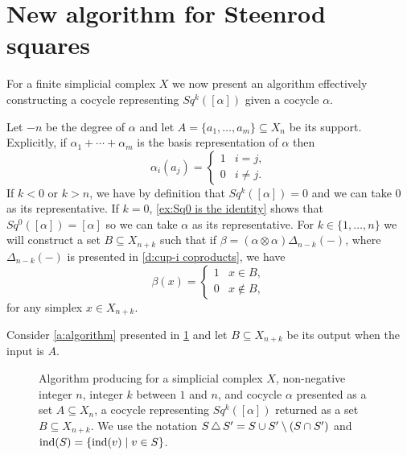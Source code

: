 
\section{New algorithm for Steenrod squares} \label{s:algorithm}


For a finite simplicial complex $X$ we now present an algorithm effectively constructing a cocycle representing $Sq^k([\alpha])$ given a cocycle $\alpha$.

Let $-n$ be the degree of $\alpha$ and let $A = \{a_1, \dots, a_m\} \subseteq X_n$ be its support.
Explicitly, if $\alpha_1 + \cdots + \alpha_m$ is the basis representation of $\alpha$ then
\begin{equation*}
\alpha_i(a_j) = \begin{cases}
1 & i=j, \\ 0 & i\neq j.
\end{cases}
\end{equation*}
If $k < 0$ or $k > n$, we have by definition that $Sq^k([\alpha]) = 0$ and we can take $0$ as its representative.
If $k = 0$, \cref{ex:Sq0 is the identity} shows that $Sq^0([\alpha]) = [\alpha]$ so we can take $\alpha$ as its representative.
For $k \in \{1, \dots, n\}$ we will construct a set $B \subseteq X_{n+k}$ such that if $\beta = (\alpha \otimes \alpha)\Delta_{n-k}(-)$, where $\Delta_{n-k}(-)$ is presented in \cref{d:cup-i coproducts}, we have
\begin{equation} \label{e:correctness}
\beta(x) =
\begin{cases}
1 & x \in B, \\
0 & x \not\in B,
\end{cases}
\end{equation}
for any simplex $x \in X_{n+k}$.

Consider \cref{a:algorithm} presented in \cref{f:algorithm} and let $B \subseteq X_{n+k}$ be its output when the input is $A$.

\begin{figure}
	
	\caption{Algorithm producing for a simplicial complex $X$, non-negative integer $n$, integer $k$ between $1$ and $n$, and cocycle $\alpha$ presented as a set $A \subseteq X_n$, a cocycle representing $Sq^k([\alpha])$ returned as a set $B \subseteq X_{n+k}$.
	We use the notation $S \operatorname{\triangle} S^\prime = S \cup S^\prime \setminus (S \cap S^\prime)$ and $\mathrm{ind}(S) = \{\mathrm{ind}(v) \mid v \in S\}$.}
	\label{f:algorithm}
\end{figure}

